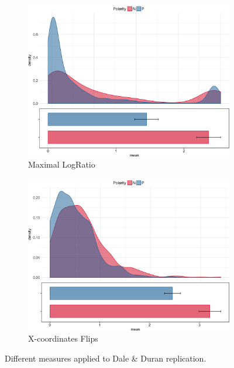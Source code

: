 \documentclass{article}
\begin{document}
\begin{figure}
%
\begin{subfigure}[b]{0.4\textwidth}
\includegraphics[width=\textwidth]{MaxRatio_negation.png}
\caption{Maximal LogRatio}
\end{subfigure}
%
\begin{subfigure}[b]{0.4\textwidth}
\includegraphics[width=\textwidth]{Xflips_negation.png}
\caption{X-coordinates Flips}
\end{subfigure}


\caption{Different measures applied to Dale \& Duran replication.}
\label{fig:different.measures.negation}

\end{figure}
\end{document}
